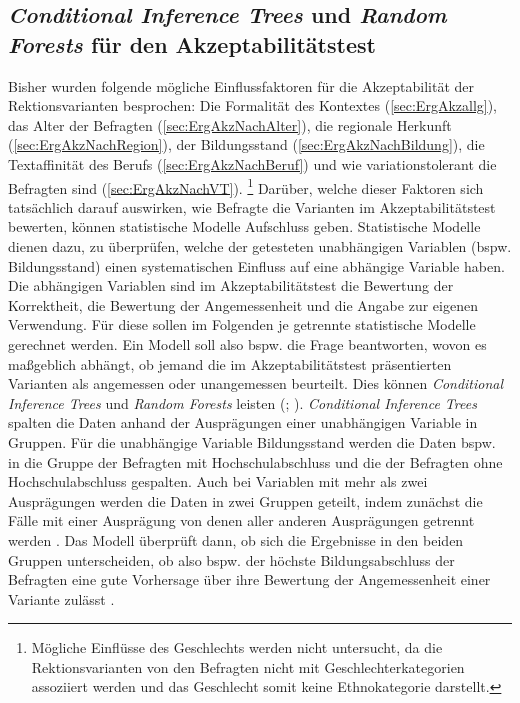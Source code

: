 \subsection{\textit{Conditional Inference Trees} und \textit{Random Forests} für den Akzeptabilitätstest}
\label{sec:ErgAkzCTrees}
Bisher wurden folgende mögliche Einflussfaktoren für die Akzeptabilität der Rektionsvarianten besprochen: 
Die Formalität des Kontextes (\autoref{sec:ErgAkzallg}), das Alter der Befragten (\autoref{sec:ErgAkzNachAlter}), die regionale Herkunft (\autoref{sec:ErgAkzNachRegion}), der Bildungsstand (\autoref{sec:ErgAkzNachBildung}), die Textaffinität des Berufs (\autoref{sec:ErgAkzNachBeruf}) und wie variationstolerant die Befragten sind (\autoref{sec:ErgAkzNachVT}).%
\footnote{Mögliche Einflüsse des Geschlechts werden nicht untersucht, da die Rektionsvarianten von den Befragten nicht mit Geschlechterkategorien assoziiert werden und das Geschlecht somit keine Ethnokategorie darstellt.} 
Darüber, welche dieser Faktoren sich tatsächlich darauf auswirken, wie Befragte die Varianten im Akzeptabilitätstest bewerten, können statistische Modelle Aufschluss geben. 
Statistische Modelle dienen dazu, zu überprüfen, welche der getesteten unabhängigen Variablen (bspw. Bildungsstand) einen systematischen Einfluss auf eine abhängige Variable haben. 
Die abhängigen Variablen sind im Akzeptabilitätstest die Bewertung der Korrektheit, die Bewertung der Angemessenheit und die Angabe zur eigenen Verwendung. 
Für diese sollen im Folgenden je getrennte statistische Modelle gerechnet werden. 
Ein Modell soll also bspw. die Frage beantworten, wovon es maßgeblich abhängt, ob jemand die im Akzeptabilitätstest präsentierten Varianten als angemessen oder unangemessen beurteilt. 
Dies können \textit{Conditional Inference Trees} und \textit{Random Forests} leisten (\citealp[s.][]{Tagliamonte.2012}; \citealp[291]{Levshina.2015}). 
\textit{Conditional Inference Trees} spalten die Daten anhand der Ausprägungen einer unabhängigen Variable in Gruppen. 
Für die unabhängige Variable \glqq Bildungsstand\grqq{} werden die Daten bspw. in die Gruppe der Befragten mit Hochschulabschluss und die der Befragten ohne Hochschulabschluss gespalten. 
Auch bei Variablen mit mehr als zwei Ausprägungen werden die Daten in zwei Gruppen geteilt, indem zunächst die Fälle mit einer Ausprägung von denen aller anderen Ausprägungen getrennt werden \citep[s.][291]{Levshina.2015}. 
Das Modell überprüft dann, ob sich die Ergebnisse in den beiden Gruppen unterscheiden, ob also bspw. der höchste Bildungsabschluss der Befragten eine gute Vorhersage über ihre Bewertung der Angemessenheit einer Variante zulässt \citep[s.][159]{Tagliamonte.2012}. 
